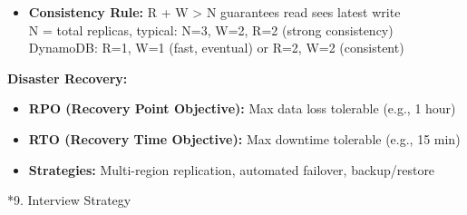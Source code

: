 \documentclass[8pt,landscape]{extarticle}
\makeatletter
\renewcommand{\section}{\@startsection{section}{1}{0pt}{4pt}{2pt}{\normalfont\large\bfseries}}
\makeatother
\begin{document}
\begin{multicols*}{3}
\begin{itemize}
\item \textbf{Consistency Rule:} R + W > N guarantees read sees latest write
  \\ N = total replicas, typical: N=3, W=2, R=2 (strong consistency)
  \\ DynamoDB: R=1, W=1 (fast, eventual) or R=2, W=2 (consistent)
\end{itemize}
\textbf{Disaster Recovery:}
\begin{itemize}
\item \textbf{RPO (Recovery Point Objective):} Max data loss tolerable (e.g., 1 hour)
\item \textbf{RTO (Recovery Time Objective):} Max downtime tolerable (e.g., 15 min)
\item \textbf{Strategies:} Multi-region replication, automated failover, backup/restore
\end{itemize}

\section*{9. Interview Strategy}


\end{multicols*}
\end{document}
